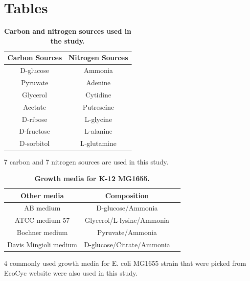 \documentclass[12pt]{article}
\begin{document}
\newpage
\section*{Tables}
\begin{table}[!ht]
\caption{
\bf{Carbon and nitrogen sources used in the study.}}
\begin{tabular}{|c|c|}
\hline \hline
Carbon Sources & Nitrogen Sources \\
\hline
D-glucose & Ammonia \\
Pyruvate & Adenine \\
Glycerol & Cytidine \\
Acetate & Putrescine \\
D-ribose & L-glycine \\
D-fructose & L-alanine \\
D-sorbitol & L-glutamine \\
\hline
\end{tabular}
\begin{flushleft} 7 carbon and 7 nitrogen sources are used in this study.
\end{flushleft}
\label{tab:label}
 \end{table}


\begin{table}[!ht]
\caption{
\bf{Growth media for K-12 MG1655.}}
\begin{tabular}{|c|c|c|}
\hline \hline
Other media & Composition \\
\hline
AB medium &  D-glucose/Ammonia\\
ATCC medium 57 &  Glycerol/L-lysine/Ammonia\\
Bochner medium &  Pyruvate/Ammonia\\
Davis Mingioli medium & D-glucose/Citrate/Ammonia\\
\hline
\end{tabular}
\begin{flushleft}4 commonly used growth media for E. coli MG1655 strain that were picked from EcoCyc website were also used in this study.
\end{flushleft}
\label{tab:label}
 \end{table}

\bigskip
\end{document}
